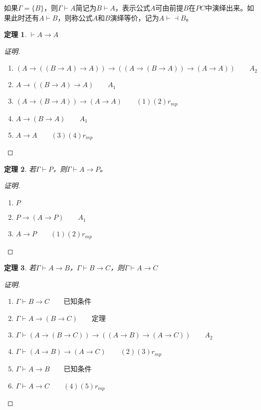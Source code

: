 \documentclass{article}
\newtheorem{Thm}{定理}
\begin{document}
\begin{CJK*}{UTF8}{gbsn}
  如果$\Gamma=\{B\}$，则$\Gamma\vdash A$简记为$B\vdash A$，表示公式$A$可由前提$B$在$PC$中演绎出来。如果此时还有$A\vdash B$，则称公式$A$和$B$演绎等价，记为$A\vdash \dashv B$。
  \begin{Thm}$\vdash A\to A$\end{Thm}
  \begin{proof}[证明]$\quad$

    \begin{enumerate}
      \item $(A\to ((B\to A) \to A))\to ((A\to (B\to A)) \to (A\to A)) \quad\quad A_2$
      \item $A\to ((B\to A) \to A) \quad\quad A_1$
      \item $(A\to (B\to A)) \to (A\to A) \quad\quad (1)(2)r_{mp}$
      \item $A\to (B\to A) \quad\quad A_1$
      \item $A\to A \quad\quad (3)(4)r_{mp}$  
    \end{enumerate}
  \end{proof}

  \begin{Thm}若$\Gamma\vdash P$，则$\Gamma\vdash A\to P$。\end{Thm}
  \begin{proof}[证明]$\quad$
    \begin{enumerate}
      \item $P \quad\quad$ 
      \item $P\to (A\to P) \quad\quad A_1$
      \item $A\to P \quad\quad (1)(2)r_{mp}$
    \end{enumerate}
  \end{proof}

  \begin{Thm}若$\Gamma\vdash A\to B$，$\Gamma \vdash B\to C$，则$\Gamma\vdash A\to C$\end{Thm}
  \begin{proof}[证明]$\quad$
    \begin{enumerate}
      \item $\Gamma\vdash B \to C\qquad$已知条件
      \item $\Gamma\vdash A\to (B\to C)\qquad$定理
      \item $\Gamma\vdash (A\to (B\to C)) \to ((A\to B)\to (A\to C))\quad \quad A_2$
      \item $\Gamma \vdash(A\to B)\to (A\to C) \quad\quad(2)(3)r_{mp}$
      \item $\Gamma \vdash A\to B\qquad$已知条件
      \item $\Gamma \vdash A\to C \quad\quad(4)(5)r_{mp}$
    \end{enumerate}
  \end{proof}


\end{CJK*}
\end{document}
